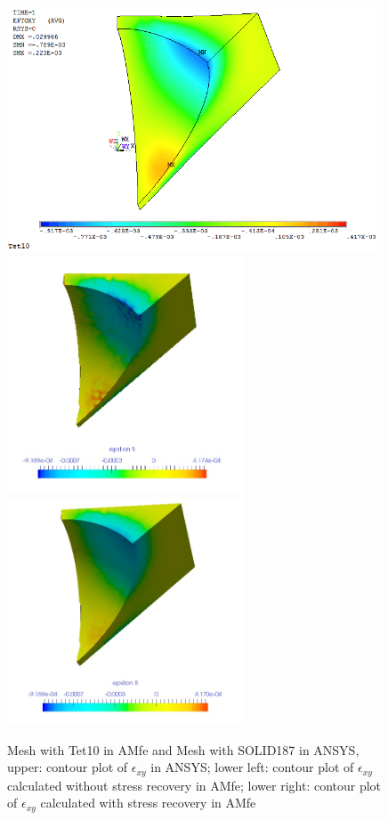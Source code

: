 \begin{figure}[htbp]
	\begin{center}
		\includegraphics[width=11cm,clip]{Tet10_Exy.png} 	
		\includegraphics[width=7cm,clip]{Tet10_Exy_PD.png} 		
		\includegraphics[width=7cm,clip]{Tet10_Exy_P.png} 		
		\caption{Mesh with Tet10 in AMfe and Mesh with SOLID187 in ANSYS, upper: contour plot of $\epsilon_{xy}$ in ANSYS; lower left: contour plot of $\epsilon_{xy}$ calculated without stress recovery in AMfe; lower right: contour plot of $\epsilon_{xy}$ calculated with stress recovery in AMfe} \label{fig: Tet10_Exy}
	\end{center}
\end{figure}
\clearpage 


